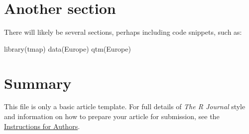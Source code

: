 \section{Another section}

There will likely be several sections, perhaps including code snippets, such as:

\begin{example}
library(tmap)
data(Europe)
qtm(Europe)
\end{example}

\section{Summary}

This file is only a basic article template. For full details of \emph{The R Journal} style and information on how to prepare your article for submission, see the \href{http://journal.r-project.org/latex/RJauthorguide.pdf}{Instructions for Authors}.


\address{Martijn Tennekes\\
  Statistics Netherlands\\
  CBS-Weg 11, 6412 EX Heerlen\\
  Netherlands\\}


